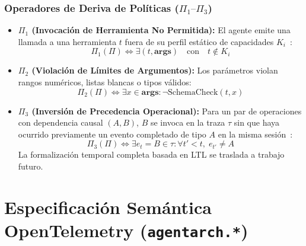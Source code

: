 \documentclass[conference]{IEEEtran}
\begin{document}
\subsubsection{Operadores de Deriva de Pol\'iticas ($\Pi_1\text{--}\Pi_3$)}
\begin{itemize}
    \item \textbf{$\Pi_1$ (Invocaci\'on de Herramienta No Permitida):} El agente emite una llamada a una herramienta $t$ fuera de su perfil est\'atico de capacidades $K_i$~\cite{wangh2026, wangs2026}:
    \begin{equation}
    \Pi_1(\Pi) \iff \exists (t, \mathbf{args}) \quad \text{con} \quad t \notin K_i
    \end{equation}
    \item \textbf{$\Pi_2$ (Violaci\'on de L\'imites de Argumentos):} Los par\'ametros violan rangos num\'ericos, listas blancas o tipos v\'alidos:
    \begin{equation}
    \Pi_2(\Pi) \iff \exists x \in \mathbf{args} : \neg \text{SchemaCheck}(t, x)
    \end{equation}
    \item \textbf{$\Pi_3$ (Inversi\'on de Precedencia Operacional):} Para un par de operaciones con dependencia causal $(A, B)$, $B$ se invoca en la traza $\tau$ sin que haya ocurrido previamente un evento completado de tipo $A$ en la misma sesi\'on~\cite{xia2026}:
    \begin{equation}
    \Pi_3(\Pi) \iff \exists e_t = B \in \tau : \forall t' < t, \; e_{t'} \neq A
    \end{equation}
    La formalizaci\'on temporal completa basada en LTL se traslada a trabajo futuro.
\end{itemize}

\section{Especificaci\'on Sem\'antica OpenTelemetry (\texttt{agentarch.*})}
\end{document}
